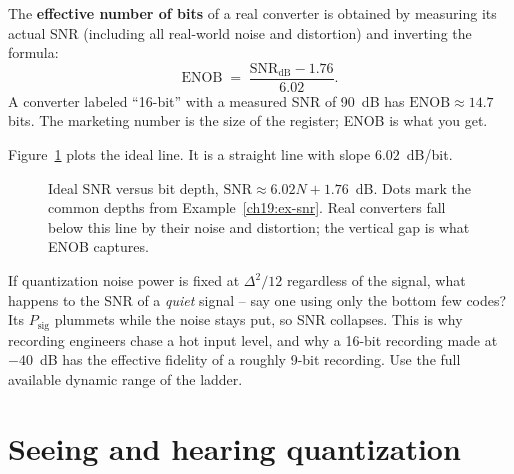 \begin{definition}[ENOB]
\label{ch19:def-enob}
The \textbf{effective number of bits} of a real converter is obtained by measuring its actual SNR
(including all real-world noise and distortion) and inverting the formula:
\[
  \mathrm{ENOB} \;=\; \frac{\mathrm{SNR}_{\mathrm{dB}} - 1.76}{6.02}.
\]
A converter labeled ``16-bit'' with a measured SNR of 90~dB has $\mathrm{ENOB}\approx 14.7$ bits.
The marketing number is the size of the register; ENOB is what you get.
\end{definition}

Figure~\ref{ch19:fig-snr} plots the ideal line. It is a straight line with slope $6.02$~dB/bit.

\begin{figure}[H]
\centering
{}
\caption{Ideal SNR versus bit depth, $\mathrm{SNR}\approx 6.02N+1.76$~dB. Dots mark the common
depths from Example~\ref{ch19:ex-snr}. Real converters fall below this line by their noise and
distortion; the vertical gap is what ENOB captures.}
\label{ch19:fig-snr}
\end{figure}

\begin{walkbox}
If quantization noise power is fixed at $\Delta^2/12$ regardless of the signal, what happens to
the SNR of a \emph{quiet} signal -- say one using only the bottom few codes? Its $P_{\mathrm{sig}}$
plummets while the noise stays put, so SNR collapses. This is why recording engineers chase a hot
input level, and why a 16-bit recording made at $-40$~dB has the effective fidelity of a
roughly 9-bit recording. Use the full available dynamic range of the ladder.
\end{walkbox}

\section{Seeing and hearing quantization}
\label{ch19:seeing}

